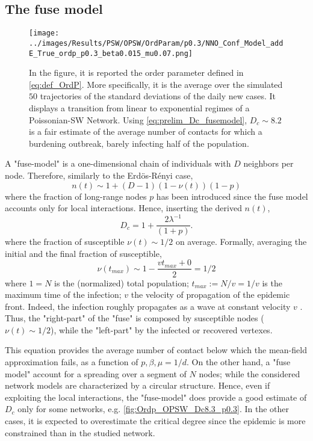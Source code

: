 \documentclass[a4paper,10pt]{book} %
\theoremstyle{definition}
\begin{document}
\subsection*{The fuse model}
\label{sec:simple_D_c_fuse_model}
\begin{figure}[t]
	\texttt{[image: ../images/Results/PSW/OPSW/OrdParam/p0.3/NNO\_Conf\_Model\_addE\_True\_ordp\_p0.3\_beta0.015\_mu0.07.png]}
	\centering
	\caption{In the figure, it is reported the order parameter defined in \autoref{eq:def_OrdP}. More specifically, it is the average over the simulated $50$ trajectories of the standard deviations of the daily new cases. It displays a transition from linear to exponential regimes of a Poissonian-SW Network. Using \autoref{eq:prelim_Dc_fusemodel}, $D_c \sim 8.2$ is a fair estimate of the average number of contacts for which a burdening outbreak, barely infecting half of the population.}
	\label{fig:SD_Threshold_Fuse_Model}
\end{figure}
A "fuse-model" is a one-dimensional chain of individuals with $D$ neighbors per node.
Therefore, similarly to the Erdös-Rényi case, 
\begin{equation}
	n(t) \sim 1+ (D-1)(1-\nu(t))(1-p)
	\label{eq:n(t)_fusemodel}
\end{equation}
where the fraction of long-range nodes $ p$ has been introduced since the fuse model accounts only for local interactions. 
Hence, inserting the derived $ n(t)$,
\begin{equation}
	D_c = 1 + \frac{2 \lambda^{-1}}{(1+p)}.
	\label{eq:simple_Dc_fusemodel}
\end{equation} 
where the fraction of susceptible $ \nu(t) \sim 1/2$ on average.  
Formally, averaging the initial and the final fraction of susceptible, 
\begin{equation}
	\nu(t_{max}) \sim 1-\frac{vt_{max}+0}{2} = 1/2
\end{equation}
where $1 = N$ is the (normalized) total population; $ t_{max}:= N/v = 1/v$ is the maximum time of the infection; $v$ the velocity of propagation of the epidemic front.  
Indeed, the infection roughly propagates as a wave at constant velocity $v$ . Thus, the "right-part" of the "fuse" is composed by susceptible nodes ($\nu(t) \sim 1/2$), while the "left-part" by the infected or recovered vertexes.

This equation provides the average number of contact below which the mean-field approximation fails, as a function of $p,\beta,\mu = 1/d$. On the other hand, a "fuse model" account for a spreading over a segment of $N$ nodes; while the considered network models are characterized by a circular structure. Hence, even if exploiting the local interactions, the "fuse-model" does provide a good estimate of $ D_c$ only for some networks, e.g. \autoref{fig:Ordp_OPSW_Dc8.3_p0.3}. In the other cases, it is expected to overestimate the critical degree since the epidemic is more constrained than in the studied network.
\end{document}
